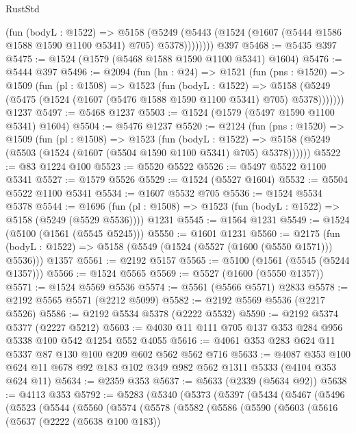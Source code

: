\begin{lexlean}{RustStd}
\begin{coremodule}
            (fun (bodyL : @1522) =>
            @5158
              (@5249 (@5443 (@1524 (@1607 (@5444 @1586 @1588 @1590 @1100 @5341) @705) @5378))))))))
    @397
@5468 := @5435 @397
@5475 := @1524 (@1579 (@5468 @1588 @1590 @1100 @5341) @1604)
@5476 := @5444 @397
@5496 := @2094
    (fun (hn : @24) =>
    @1521
      (fun (pns : @1520) =>
      @1509
        (fun (pl : @1508) =>
        @1523
          (fun (bodyL : @1522) =>
          @5158 (@5249 (@5475 (@1524 (@1607 (@5476 @1588 @1590 @1100 @5341) @705) @5378)))))))
    @1237
@5497 := @5468 @1237
@5503 := @1524 (@1579 (@5497 @1590 @1100 @5341) @1604)
@5504 := @5476 @1237
@5520 := @2124
    (fun (pns : @1520) =>
    @1509
      (fun (pl : @1508) =>
      @1523
        (fun (bodyL : @1522) =>
        @5158 (@5249 (@5503 (@1524 (@1607 (@5504 @1590 @1100 @5341) @705) @5378))))))
@5522 := @83 @1224 @100
@5523 := @5520 @5522
@5526 := @5497 @5522 @1100 @5341
@5527 := @1579 @5526
@5529 := @1524 (@5527 @1604)
@5532 := @5504 @5522 @1100 @5341
@5534 := @1607 @5532 @705
@5536 := @1524 @5534 @5378
@5544 := @1696
    (fun (pl : @1508) => @1523 (fun (bodyL : @1522) => @5158 (@5249 (@5529 @5536))))
    @1231
@5545 := @1564 @1231
@5549 := @1524 (@5100 (@1561 (@5545 @5245)))
@5550 := @1601 @1231
@5560 := @2175
    (fun (bodyL : @1522) => @5158 (@5549 (@1524 (@5527 (@1600 (@5550 @1571))) @5536)))
    @1357
@5561 := @2192 @5157
@5565 := @5100 (@1561 (@5545 (@5244 @1357)))
@5566 := @1524 @5565
@5569 := @5527 (@1600 (@5550 @1357))
@5571 := @1524 @5569 @5536
@5574 := @5561 (@5566 @5571) @2833
@5578 := @2192 @5565 @5571 (@2212 @5099)
@5582 := @2192 @5569 @5536 (@2217 @5526)
@5586 := @2192 @5534 @5378 (@2222 @5532)
@5590 := @2192 @5374 @5377 (@2227 @5212)
@5603 := @4030 @11 @111 @705 @137 @353 @284 @956 @5338 @100 @542 @1254 @552 @4055
@5616 := @4061 @353 @283 @624 @11 @5337 @87 @130 @100 @209 @602 @562 @562 @716
@5633 := @4087
    @353
    @100
    @624
    @11
    @678
    @92
    @183
    @102
    @349
    @982
    @562
    @1311
    @5333
    (@4104 @353 @624 @11)
@5634 := @2359 @353
@5637 := @5633 (@2339 (@5634 @92))
@5638 := @4113 @353
@5792 := @5283
    (@5340
      (@5373
        (@5397
          (@5434
            (@5467
              (@5496
                (@5523
                  (@5544
                    (@5560
                      (@5574
                        (@5578
                          (@5582
                            (@5586
                              (@5590
                                (@5603
                                  (@5616
                                    (@5637
                                      (@2222 (@5638 @100 @183))

\end{coremodule}
\end{lexlean}
